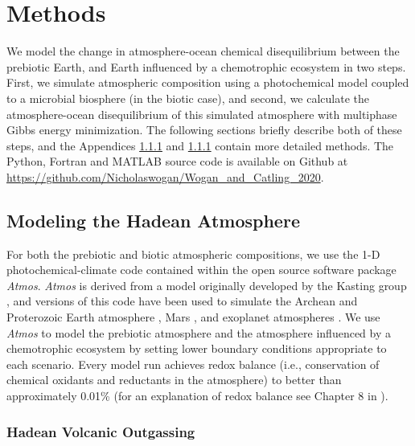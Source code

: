 \section{Methods}

We model the change in atmosphere-ocean chemical disequilibrium between the prebiotic Earth, and Earth influenced by a chemotrophic ecosystem in two steps. First, we simulate atmospheric composition using a photochemical model coupled to a microbial biosphere (in the biotic case), and second, we calculate the atmosphere-ocean disequilibrium of this simulated atmosphere with multiphase Gibbs energy minimization. The following sections briefly describe both of these steps, and the Appendices 
\ref{} %
and \ref{} %
contain more detailed methods. The Python, Fortran and MATLAB source code is available on Github at \url{https://github.com/Nicholaswogan/Wogan_and_Catling_2020}.

\subsection{Modeling the Hadean Atmosphere}

For both the prebiotic and biotic atmospheric compositions, we use the 1-D photochemical-climate code contained within the open source software package \textit{Atmos}. \textit{Atmos} is derived from a model originally developed by the Kasting group \citep{Pavlov_2001}, and versions of this code have been used to simulate the Archean and Proterozoic Earth atmosphere \citep{Zahnle_2006}, Mars \citep{Sholes_2019,Smith_2014,Zahnle_2008}, and exoplanet atmospheres \citep{Arney_2016,Schwieterman_2019}. We use \textit{Atmos} to model the prebiotic atmosphere and the atmosphere influenced by a chemotrophic ecosystem by setting lower boundary conditions appropriate to each scenario. Every model run achieves redox balance (i.e., conservation of chemical oxidants and reductants in the atmosphere) to better than approximately 0.01\% (for an explanation of redox balance see Chapter 8 in \citet{Catling_2017}).

\subsubsection{Hadean Volcanic Outgassing}

